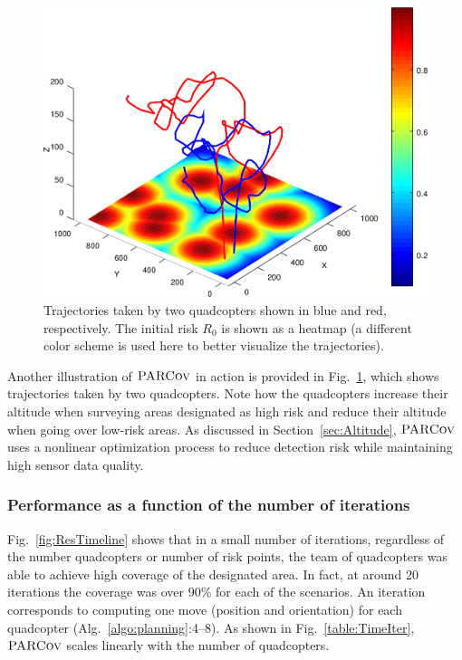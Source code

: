\documentclass[letterpaper, 10pt, conference]{ieeeconf}
\newcommand{\Function}[1]{\ensuremath{{ \textsc{#1}}}}
\newcommand{\Name}{\Function{\small{PARCov}}}
\begin{document}
\begin{figure}[t]
\centering
\includegraphics[width=0.8\columnwidth]{usef/trajectories}

\caption{Trajectories taken by two quadcopters shown in blue and red,
respectively. The initial risk $R_0$ is shown as a heatmap (a different color scheme is used here to better visualize the trajectories). }

\label{fig:Trajs}
\end{figure}

Another illustration of $\Name$ in action is provided in
Fig.~\ref{fig:Trajs}, which shows  trajectories
taken by two quadcopters. Note how the quadcopters increase their
altitude when surveying areas designated as high risk and reduce their
altitude when going over low-risk areas. As discussed in
Section~\ref{sec:Altitude}, $\Name$ uses a nonlinear optimization
process to reduce detection risk while maintaining
high sensor data quality.


\subsubsection{Performance as a function of the number of iterations}
Fig.~\ref{fig:ResTimeline}
shows that in a small number of iterations, regardless
of the number quadcopters or number of risk points, the team of quadcopters
was able to achieve high coverage of the designated
area. In fact, at around 20 iterations the coverage was over 90\%
for each of the scenarios. An iteration corresponds to computing one
move (position and orientation) for each quadcopter
(Alg.~\ref{algo:planning}:4--8). As shown in
Fig.~\ref{table:TimeIter}, $\Name$ scales linearly with the number of
quadcopters. 

\end{document}
